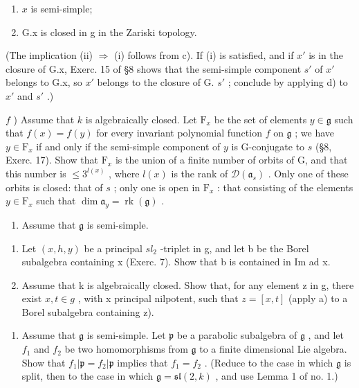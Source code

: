 \begin{enumerate}
\def\labelenumi{(\roman{enumi})}
\item
  \(x\) is semi-simple;
\item
  G.x is closed in g in the Zariski topology.
\end{enumerate}

(The implication (ii) \(\Longrightarrow\) (i) follows from c). If (i) is satisfied, and if \(x'\) is in the closure of G.x, Exerc. 15 of §8 shows that the semi-simple component \(s'\) of \(x'\) belongs to G.x, so \(x'\) belongs to the closure of G. \(s'\) ; conclude by applying d) to \(x'\) and \(s'\) .)

\(f\) ) Assume that \(k\) is algebraically closed. Let \(\mathrm{F}_x\) be the set of elements \(y\in \mathfrak{g}\) such that \(f(x) = f(y)\) for every invariant polynomial function \(f\) on \(\mathfrak{g}\) ; we have \(y\in \mathrm{F}_x\) if and only if the semi-simple component of \(y\) is G-conjugate to \(s\) (§8, Exerc. 17). Show that \(\mathrm{F}_x\) is the union of a finite number of orbits of G, and that this number is \(\leq 3^{l(x)}\) , where \(l(x)\) is the rank of \(\mathcal{D}(\mathfrak{a}_s)\) . Only one of these orbits is closed: that of \(s\) ; only one is open in \(\mathrm{F}_x\) : that consisting of the elements \(y\in \mathrm{F}_x\) such that \(\dim \mathfrak{a}_y = \operatorname {rk}(\mathfrak{g})\) .

\begin{enumerate}
\def\labelenumi{\arabic{enumi})}
\setcounter{enumi}{12}
\tightlist
\item
  Assume that \(\mathfrak{g}\) is semi-simple.
\end{enumerate}

\begin{enumerate}
\def\labelenumi{\alph{enumi})}
\item
  Let \((x, h, y)\) be a principal \(sl_{2}\) -triplet in g, and let b be the Borel subalgebra containing x (Exerc. 7). Show that b is contained in Im ad x.
\item
  Assume that k is algebraically closed. Show that, for any element z in g, there exist \(x, t \in g\) , with x principal nilpotent, such that \(z = [x, t]\) (apply a) to a Borel subalgebra containing z).
\end{enumerate}

\begin{enumerate}
\def\labelenumi{\arabic{enumi})}
\setcounter{enumi}{13}
\tightlist
\item
  Assume that \(\mathfrak{g}\) is semi-simple. Let \(\mathfrak{p}\) be a parabolic subalgebra of \(\mathfrak{g}\) , and let \(f_{1}\) and \(f_{2}\) be two homomorphisms from \(\mathfrak{g}\) to a finite dimensional Lie algebra. Show that \(f_{1}|\mathfrak{p} = f_{2}|\mathfrak{p}\) implies that \(f_{1} = f_{2}\) . (Reduce to the case in which \(\mathfrak{g}\) is split, then to the case in which \(\mathfrak{g} = \mathfrak{sl}(2,k)\) , and use Lemma 1 of no. 1.)
\end{enumerate}

